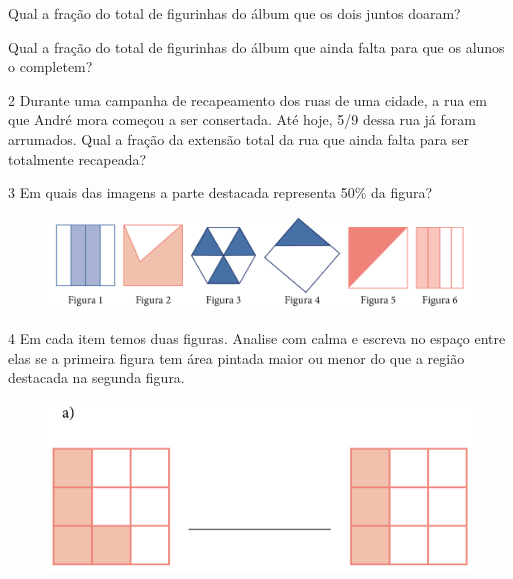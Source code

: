 \begin{escolha}
\item
  Qual a fração do total de figurinhas do álbum que os dois juntos doaram?\\

\item
  Qual a fração do total de figurinhas do álbum que ainda falta para que os
  alunos o completem?\\
\end{escolha}


\num{2} Durante uma campanha de recapeamento dos ruas de uma cidade, a rua
em que André mora começou a ser consertada. Até hoje, 5/9 dessa rua já
foram arrumados. Qual a fração da extensão total da rua que ainda falta para ser totalmente recapeada?


\num{3} Em quais das imagens a parte destacada representa 50\% da figura?

\begin{figure}[htpb!]
\includegraphics[width=\textwidth]{../ilustracoes/MAT5/SAEB_5ANO_MAT_figura68.png}
\end{figure}



\pagebreak
\num{4} Em cada item temos duas figuras. Analise com calma e escreva no
espaço entre elas se a primeira figura tem área pintada maior ou menor
do que a região destacada na segunda figura.

\begin{figure}[htpb!]
\centering
\includegraphics[width=.8\textwidth]{../ilustracoes/MAT5/SAEB_5ANO_MAT_figura69-1.png}
\end{figure}

